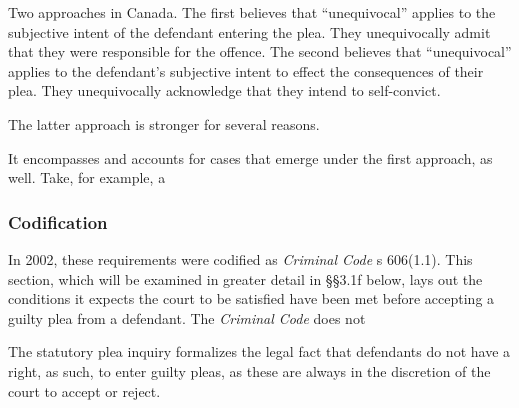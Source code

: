 Two approaches in Canada. The first believes that ``unequivocal'' applies to the subjective intent of the defendant entering the plea. They unequivocally admit that they were responsible for the offence. The second believes that ``unequivocal'' applies to the defendant's subjective intent to effect the consequences of their plea. They unequivocally acknowledge that they intend to self-convict.

The latter approach is stronger for several reasons. 

It encompasses and accounts for cases that emerge under the first approach, as well. Take, for example, a

\subsubsection{Codification}

In 2002, these requirements were codified as \textit{Criminal Code} s 606(1.1). This section, which will be examined in greater detail in §§3.1f below, lays out the conditions it expects the court to be satisfied have been met before accepting a guilty plea from a defendant. The \textit{Criminal Code} does not 

The statutory plea inquiry formalizes the legal fact that defendants do not have a right, as such, to enter guilty pleas, as these are always in the discretion of the court to accept or reject.
